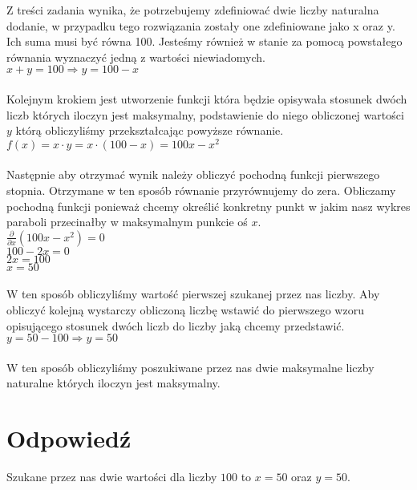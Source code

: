 \documentclass[UTF8]{article}
\begin{document}
Z treści zadania wynika, że potrzebujemy zdefiniować dwie liczby naturalna dodanie, w przypadku tego rozwiązania zostały one zdefiniowane jako x oraz y. Ich suma musi być równa 100. Jesteśmy również w stanie za pomocą powstałego równania wyznaczyć jedną z wartości niewiadomych. ~
\\$x + y = 100 \Rightarrow y = 100 - x $\\
\\Kolejnym krokiem jest utworzenie funkcji która będzie opisywała stosunek dwóch liczb których iloczyn jest maksymalny, podstawienie do niego obliczonej wartości $y$ którą obliczyliśmy przekształcając powyższe równanie.~
\\$ f(x) = x \cdot y = x \cdot (100-x) = 100x - x^{2} $\\
\\Następnie aby otrzymać wynik należy obliczyć pochodną funkcji pierwszego stopnia. Otrzymane w ten sposób równanie przyrównujemy do zera. Obliczamy pochodną funkcji  ponieważ chcemy określić konkretny punkt w jakim nasz wykres paraboli przecinałby w maksymalnym punkcie oś $ x $.~
\\$ \frac{\partial}{\partial x}(100x - x^{2}) = 0$
\\$100 - 2x = 0$
\\$2x = 100$
\\$x = 50 $\\
\\W ten sposób obliczyliśmy wartość pierwszej szukanej przez nas liczby. Aby obliczyć kolejną wystarczy obliczoną liczbę wstawić do pierwszego wzoru opisującego stosunek dwóch liczb do liczby jaką chcemy przedstawić.~
\\$ y = 50 - 100 \Rightarrow y = 50 $\\
\\W ten sposób obliczyliśmy poszukiwane przez nas dwie maksymalne liczby naturalne których iloczyn jest maksymalny.~

\section{Odpowiedź}

	Szukane przez nas dwie wartości dla liczby $100$ to $x = 50$ oraz $y = 50$. ~
\end{document}

